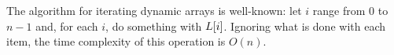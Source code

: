 \HdrDynArrayImpl

The algorithm for iterating dynamic arrays is well-known: let $i$ range from $0$ to $n - 1$ and, for each $i$, do something with $L[i]$. Ignoring what is done with each item, the time complexity of this operation is $O(n)$.